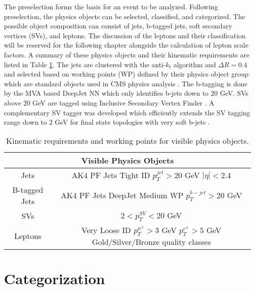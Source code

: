The preselection forms the basis for an event to be analyzed. Following preselection, the physics objects can be selected, classified, and categorized. The possible object composition can consist of jets, b-tagged jets, soft secondary vertices (SVs), and leptons. The discussion of the leptons and their classification will be reserved for the following chapter alongside the calculation of lepton scale factors. A summary of these physics objects and their kinematic requirements are listed in Table \ref{tab:physicsobjects}. The jets are clustered with the anti-$k_t$ algorithm and $\Delta R = 0.4$ \cite{Cacciari:2008gp} and selected based on working points (WP) defined by their physics object group which are standard objects used in CMS physics analysis \cite{CMS:2010xta}. The b-tagging is done by the MVA based DeepJet NN \cite{Stoye:2018qgr} which only identifies b-jets down to 20 GeV. SVs above 20 GeV are tagged using Inclusive Secondary Vertex Finder \cite{CMS:2011yuk}. A complementary SV tagger was developed which efficiently extends the SV tagging range down to 2 GeV for final state topologies with very soft b-jets \cite{erich}.


\begin{table}
\centering
\caption{Kinematic requirements and working points for visible physics objects.}
\begin{tabular}{c|c}
\hline 
\multicolumn{2}{c}{Visible Physics Objects} \\ 
\hline 
\hline
Jets & \makecell{AK4 PF Jets \\ Tight ID \\ $p_T^{jet} > 20$ GeV \\ $|\eta| <2.4$} \\ 
\hline
B-tagged Jets & \makecell{AK4 PF Jets \\ DeepJet Medium WP \\ $p_T^{b-jet} > 20 $ GeV}  \\ 
\hline
SVs & $2<p_T^{SV}<20$ GeV \\ 
\hline
Leptons & \makecell{Very Loose ID \\ $p_T^{\mu^\pm} > 3$ GeV \\ $p_T^{e^\pm} > 5 $ GeV \\ Gold/Silver/Bronze quality classes} \\ 
\hline 
\end{tabular} 
\label{tab:physicsobjects}
\end{table}

\section{Categorization}

